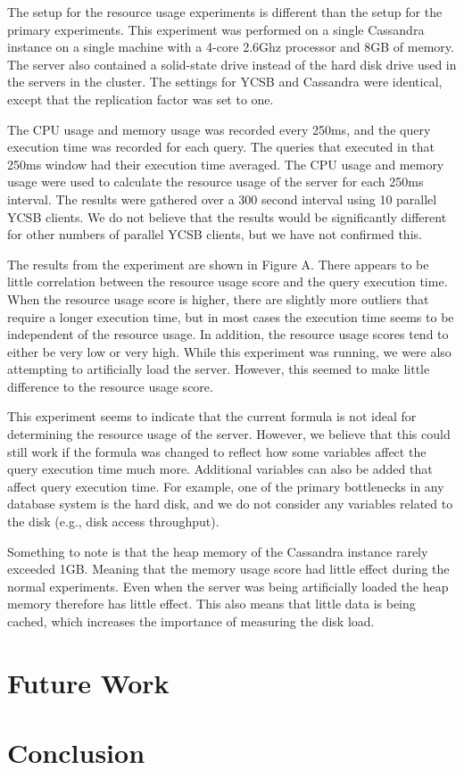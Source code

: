\documentclass[]{acm_proc_article-sp}
\begin{document}
The setup for the resource usage experiments is different than the setup for the primary experiments. This experiment was performed on a single Cassandra instance on a single machine with a 4-core 2.6Ghz processor and 8GB of memory. The server also contained a solid-state drive instead of the hard disk drive used in the servers in the cluster. The settings for YCSB and Cassandra were identical, except that the replication factor was set to one.

The CPU usage and memory usage was recorded every 250ms, and the query execution time was recorded for each query. The queries that executed in that 250ms window had their execution time averaged. The CPU usage and memory usage were used to calculate the resource usage of the server for each 250ms interval. The results were gathered over a 300 second interval using 10 parallel YCSB clients. We do not believe that the results would be significantly different for other numbers of parallel YCSB clients, but we have not confirmed this.

The results from the experiment are shown in Figure A. There appears to be little correlation between the resource usage score and the query execution time. When the resource usage score is higher, there are slightly more outliers that require a longer execution time, but in most cases the execution time seems to be independent of the resource usage. In addition, the resource usage scores tend to either be very low or very high. While this experiment was running, we were also attempting to artificially load the server. However, this seemed to make little difference to the resource usage score. 

This experiment seems to indicate that the current formula is not ideal for determining the resource usage of the server. However, we believe that this could still work if the formula was changed to reflect how some variables affect the query execution time much more.  Additional variables can also be added that affect query execution time. For example, one of the primary bottlenecks in any database system is the hard disk, and we do not consider any variables related to the disk (e.g., disk access throughput).

Something to note is that the heap memory of the Cassandra instance rarely exceeded 1GB. Meaning that the memory usage score had little effect during the normal experiments. Even when the server was being artificially loaded the heap memory therefore has little effect. This also means that little data is being cached, which increases the importance of measuring the disk load.

\section{Future Work}

\section{Conclusion}



\end{document}
